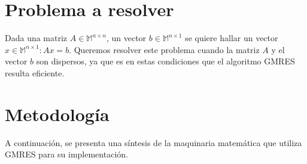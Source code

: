 \documentclass{endm}
\begin{document}
\section{Problema a resolver}\label{Problem}
Dada una matriz $A \in \mathbb{M}^{n \times n}$, un vector $b \in \mathbb{M}^{n \times 1}$ se quiere hallar un vector $x \in \mathbb{M}^{n \times 1} : Ax=b$. Queremos resolver este problema cuando la matriz $A$ y el vector $b$ son dispersos, ya que es en estas condiciones que el algoritmo GMRES resulta eficiente.


\section{Metodolog\'ia}\label{AA}
A continuaci\'on, se presenta una síntesis de la maquinaria matemática que utiliza GMRES para su implementación.\\

\end{document}
